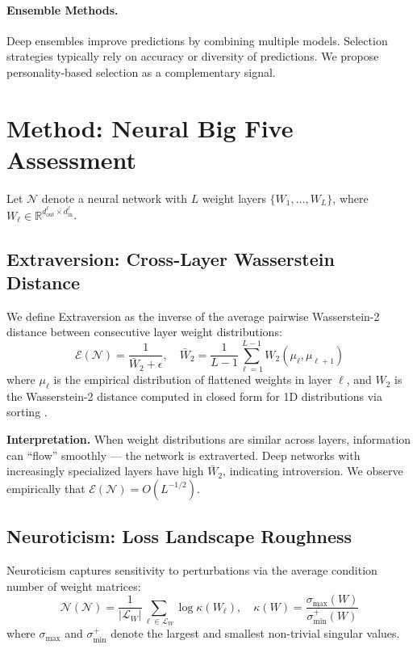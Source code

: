 \documentclass[letterpaper]{article}
\begin{document}
\paragraph{Ensemble Methods.}
Deep ensembles \citep{lakshminarayanan2017simple, dietterich2000ensemble} improve predictions by combining multiple models. Selection strategies typically rely on accuracy or diversity of predictions. We propose personality-based selection as a complementary signal.

\section{Method: Neural Big Five Assessment}
\label{sec:method}

Let $\mathcal{N}$ denote a neural network with $L$ weight layers $\{W_1, \ldots, W_L\}$, where $W_\ell \in \mathbb{R}^{d_{\text{out}}^\ell \times d_{\text{in}}^\ell}$.

\subsection{Extraversion: Cross-Layer Wasserstein Distance}

We define Extraversion as the inverse of the average pairwise Wasserstein-2 distance between consecutive layer weight distributions:
\begin{equation}
    \mathcal{E}(\mathcal{N}) = \frac{1}{\bar{W}_2 + \epsilon}, \quad \bar{W}_2 = \frac{1}{L-1} \sum_{\ell=1}^{L-1} W_2(\mu_\ell, \mu_{\ell+1})
    \label{eq:extraversion}
\end{equation}
where $\mu_\ell$ is the empirical distribution of flattened weights in layer $\ell$, and $W_2$ is the Wasserstein-2 distance computed in closed form for 1D distributions via sorting \citep{bonneel2015sliced}.

\textbf{Interpretation.} When weight distributions are similar across layers, information can ``flow'' smoothly — the network is extraverted. Deep networks with increasingly specialized layers have high $\bar{W}_2$, indicating introversion. We observe empirically that $\mathcal{E}(\mathcal{N}) = O(L^{-1/2})$.

\subsection{Neuroticism: Loss Landscape Roughness}

Neuroticism captures sensitivity to perturbations via the average condition number of weight matrices:
\begin{equation}
    \mathcal{N}(\mathcal{N}) = \frac{1}{|\mathcal{L}_W|} \sum_{\ell \in \mathcal{L}_W} \log \kappa(W_\ell), \quad \kappa(W) = \frac{\sigma_{\max}(W)}{\sigma_{\min}^+(W)}
    \label{eq:neuroticism}
\end{equation}
where $\sigma_{\max}$ and $\sigma_{\min}^+$ denote the largest and smallest non-trivial singular values.
\end{document}
